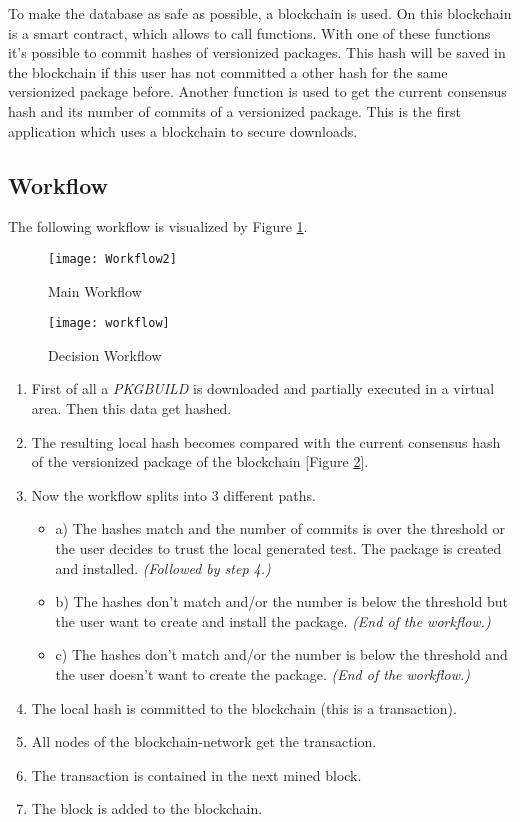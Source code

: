 To make the database as safe as possible, a blockchain is used. On this blockchain is a smart contract, which allows to call functions. With one of these functions it's possible to commit hashes of versionized packages. This hash will be saved in the blockchain if this user has not committed a other hash for the same versionized package before. Another function is used to get the current consensus hash and its number of commits of a versionized package. This is the first application which uses a blockchain to secure downloads.

\subsection*{Workflow}
The following workflow is visualized by Figure \ref{fig:main_workflow}.
\begin{figure}
	\centering
		\texttt{[image: Workflow2]}
	\caption{Main Workflow}
	\label{fig:main_workflow}
\end{figure}

\begin{figure}
	\centering
		\texttt{[image: workflow]}
	\caption{Decision Workflow}
	\label{fig:decision_workflow}
\end{figure}


\begin{enumerate}
	\item First of all a \textit{PKGBUILD} is downloaded and partially executed in a virtual area. Then this data get hashed. 
	\item The resulting local hash becomes compared with the current consensus hash of the versionized package of the blockchain [Figure \ref{fig:decision_workflow}]. 
	\item Now the workflow splits into 3 different paths.
	\begin{itemize}
		\item a) The hashes match and the number of commits is over the threshold or the user decides to trust the local generated test. The package is created and installed. \textit{(Followed by step 4.)}
		\item b) The hashes don't match and/or the number is below the threshold but the user want to create and install the package. \textit{(End of the workflow.)}
		\item c) The hashes don't match and/or the number is below the threshold and the user doesn't want to create the package. \textit{(End of the workflow.)}
	\end{itemize}
	\item The local hash is committed to the blockchain (this is a transaction).
	\item All nodes of the blockchain-network get the transaction.
	\item The transaction is contained in the next mined block.
	\item The block is added to the blockchain.
\end{enumerate}